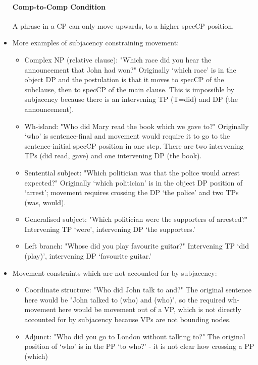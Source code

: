 \documentclass{article}
\begin{document}
\begin{itemize}
    \paragraph{Comp-to-Comp Condition} A phrase in a CP can only move upwards, to a higher specCP position.
    \item More examples of subjacency constraining movement:
    \begin{itemize}
        \item Complex NP (relative clause): "Which race did you hear the announcement that John had won?" Originally `which race' is in the object DP and the postulation is that it moves to specCP of the subclause, then to specCP of the main clause. This is impossible by subjacency because there is an intervening TP (T=did) and DP (the announcement).
        \item Wh-island: "Who did Mary read the book which we gave to?" Originally `who' is sentence-final and movement would require it to go to the sentence-initial specCP position in one step. There are two intervening TPs (did read, gave) and one intervening DP (the book).
        \item Sentential subject: "Which politician was that the police would arrest expected?" Originally `which politician' is in the object DP position of `arrest'; movement requires crossing the DP `the police' and two TPs (was, would).
        \item Generalised subject: "Which politician were the supporters of arrested?" Intervening TP `were', intervening DP `the supporters.'
        \item Left branch: "Whose did you play favourite guitar?" Intervening TP `did (play)', intervening DP `favourite guitar.'
    \end{itemize}
    \item Movement constraints which are not accounted for by subjacency:
    \begin{itemize}
        \item Coordinate structure: "Who did John talk to and?" The original sentence here would be "John talked to (who) and (who)", so the required wh-movement here would be movement out of a VP, which is not directly accounted for by subjacency because VPs are not bounding nodes.
        \item Adjunct: "Who did you go to London without talking to?" The original position of `who' is in the PP `to who?' - it is not clear how crossing a PP (which)
    \end{itemize}

\end{itemize}
\end{document}
